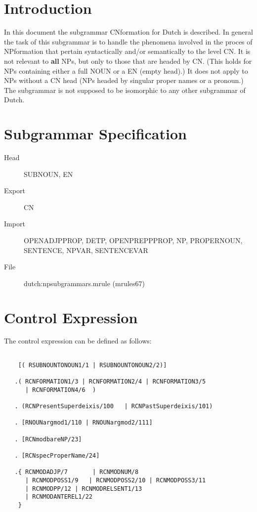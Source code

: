 

   \RosDate{\today}
   \RosSupersedes{-}
   \MakeRosTitle
%
%


\section{Introduction}
In this document the subgrammar CNformation for Dutch is described.
In general the task of this subgrammar 
is to handle the phenomena involved in the proces of NPformation that pertain 
syntactically and/or semantically to the level CN.
It is not relevant to {\bf all} 
NPs, but only to those 
that are headed by CN. (This holds for NPs containing either a full NOUN or a 
EN (empty head).)
It does not apply to NPs without a CN head (NPs 
headed by singular proper names or a pronoun.)
The subgrammar is not supposed to be isomorphic to any other subgrammar 
of Dutch. 

\section{Subgrammar Specification}

\begin{description}
  \item[Head] SUBNOUN, EN
  \item[Export] CN
  \item[Import] 
OPENADJPPROP,  DETP, OPENPREPPPROP, 
NP, PROPERNOUN, SENTENCE, NPVAR, SENTENCEVAR

  \item[File] dutch:npsubgrammars.mrule (mrules67)
\end{description}

\section{Control Expression}
The control expression can be defined as follows:
\begin{verbatim}

    [( RSUBNOUNTONOUN1/1 | RSUBNOUNTONOUN2/2)]

   .( RCNFORMATION1/3 | RCNFORMATION2/4 | RCNFORMATION3/5 
      | RCNFORMATION4/6  )

   . (RCNPresentSuperdeixis/100   | RCNPastSuperdeixis/101)

   . [RNOUNargmod1/110 | RNOUNargmod2/111]

   . [RCNmodbareNP/23]

   . [RCNspecProperName/24]

   .{ RCNMODADJP/7       | RCNMODNUM/8    
      | RCNMODPOSS1/9   | RCNMODPOSS2/10 | RCNMODPOSS3/11 
      | RCNMODPP/12 | RCNMODRELSENT1/13 
      | RCNMODANTEREL1/22
    }            

\end{verbatim}

